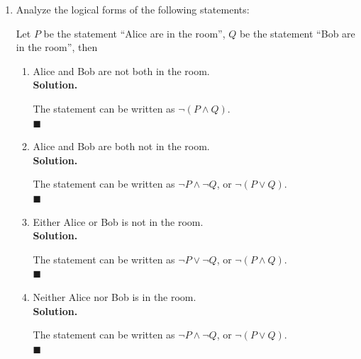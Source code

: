 \documentclass{report}
\newcommand{\sol}{\vspace{1em}\\\textbf{Solution.}\vspace{0.5em}}
\newcommand{\qed}{‎\\‎\hfill$\blacksquare$\vspace{1em}}
\begin{document}
\begin{enumerate}[leftmargin=*]
\begin{enumerate}
                  \item I'll have either fish or chicken, but I won't have both fish and mashed
                        potatoes. \sol{}

                        Let $P$ be the statement ``I'll have fish'', $Q$ be the statement ``I'll have
                        chicken'', $R$ be the statement ``I'll have mashed potatoes'', then the
                        statement can be written as $(P \vee Q) \wedge \neg(P \wedge R)$. \qed

                  \item 3 is a common divisor of 6,9, and 15.
                        \sol{}

                        Let $P(n)$ be the statement ``3 is a divisor of $n$'', then the statement can
                        be written as $P(6) \wedge P(9) \wedge P(15)$. \qed
            \end{enumerate}

      \item  Analyze the logical forms of the following statements:

            Let $P$ be the statement ``Alice are in the room'', $Q$ be the statement ``Bob
            are in the room'', then
            \begin{enumerate}
                  \item Alice and Bob are not both in the room. \sol{}

                        The statement can be written as $\neg(P \wedge Q)$. \qed

                  \item Alice and Bob are both not in the room. \sol{}

                        The statement can be written as $\neg P \wedge \neg Q$, or $\neg(P \vee Q)$.
                        \qed

                  \item Either Alice or Bob is not in the room. \sol{}

                        The statement can be written as $\neg P \vee \neg Q$, or $\neg(P \wedge Q)$.
                        \qed

                  \item Neither Alice nor Bob is in the room. \sol{}

                        The statement can be written as $\neg P \wedge \neg Q$, or $\neg(P \vee Q)$.
                        \qed
            \end{enumerate}


\end{enumerate}
\end{document}
